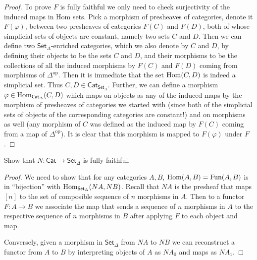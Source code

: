 \begin{proof}
To prove $F$ is fully faithful we only need to check surjectivity of
the induced maps in Hom sets. Pick a morphism of presheaves
of categories, denote it
$F(\varphi)$, between two presheaves of categories $F(C)$ and  $F(D)$,
both of whose simplicial sets of objects are constant, namely
two sets $C$ and $D$.
Then we can define two $\mathsf{Set}_\Delta$-enriched categories,
which we also denote by $C$ and $D$,
by defining their objects to be the sets $C$ and $D$, and their morphisms to be
the collections of all the induced morphisms by $F(C)$ and $F(D)$ coming from
morphisms of $\Delta^{\text{op}}$.
Then it is immediate that the set $\mathop{\mathrm{Hom}}\nolimits(C,D)$ is indeed a simplicial set.
Thus $C,D \in \mathsf{Cat}_{\mathsf{Set}_\Delta}$. Further, we
can define a morphism $\varphi \in \mathop{\mathrm{Hom}}\nolimits_{\mathsf{Cat}_\Delta}(C,D)$ 
which maps on objects as any of the induced maps by the morphism of presheaves
of categories we started with (since both of the simplicial sets of objects
of the corresponding categories are constant!)
and on morphisms as well (any morphism of $C$ was defined as the
induced map by $F(C)$ coming from a map of $\Delta^{\text{op}}$).
It is clear that this morphism is mapped to $F(\varphi)$ under $F$.
\end{proof}

\begin{exercise}[1.3]
\label{exercise-N-is-fully-faithful}
Show that $N:\mathsf{Cat}\to\mathsf{Set}_\Delta$ is fully faithful.
\end{exercise}

\begin{proof}
We need to show that for any categories $A,B$,
$\mathop{\mathrm{Hom}}\nolimits(A,B)=\text{Fun}(A,B)$ is in ``bijection'' with
$\mathop{\mathrm{Hom}}\nolimits_{\mathsf{Set}_\Delta}(NA,NB)$.
Recall that
$NA$ is the presheaf that maps $[n]$ to
the set of composible sequence of $n$ morphisms in $A$.
Then to a functor $F:A \to B$ we associate the
map that sends a sequence of $n$ morphisms in $A$ 
to the respective sequence of $n$ morphisms in $B$ 
after applying $F$ to each object and map.

Conversely, given a morphism in $\mathsf{Set}_\Delta$
from $NA$ to $NB$
we can reconstruct a functor from $A$ to $B$
 by interpreting objects of $A$ as $NA_0$ and 
maps as $NA_1$.
\end{proof}






